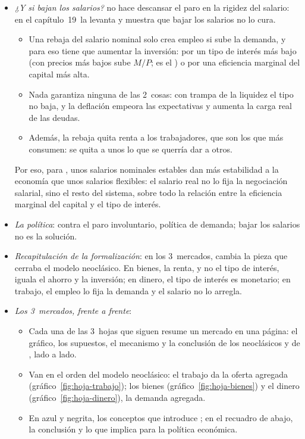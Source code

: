 \documentclass[11pt]{article}
\begin{document}
\begin{itemize}
\item \emph{¿Y si bajan los salarios?}  no hace descansar el paro en la rigidez del salario: en el capítulo~19~la levanta y muestra que bajar los salarios no lo cura\nocite{Keynes1936}.
  \begin{itemize}
  \item Una rebaja del salario nominal solo crea empleo si sube la demanda, y para eso tiene que aumentar la inversión: por un tipo de interés más bajo (con precios más bajos sube $M/P$; es el ) o por una eficiencia marginal del capital más alta.
  \item Nada garantiza ninguna de las 2~cosas: con trampa de la liquidez el tipo no baja, y la deflación empeora las expectativas y aumenta la carga real de las deudas.
  \item Además, la rebaja quita renta a los trabajadores, que son los que más consumen: se quita a unos lo que se querría dar a otros.
  \end{itemize}
  Por eso, para , unos salarios nominales estables dan más estabilidad a la economía que unos salarios flexibles: el salario real no lo fija la negociación salarial, sino el resto del sistema, sobre todo la relación entre la eficiencia marginal del capital y el tipo de interés\nocite{Keynes1936}.
\item \emph{La política}: contra el paro involuntario, política de demanda; bajar los salarios no es la solución.
\item \emph{Recapitulación de la formalización}: en los 3~mercados,  cambia la pieza que cerraba el modelo neoclásico. En bienes, la renta, y no el tipo de interés, iguala el ahorro y la inversión; en dinero, el tipo de interés es monetario; en trabajo, el empleo lo fija la demanda y el salario no lo arregla.
\end{itemize}

\begin{itemize}
\item \emph{Los 3~mercados, frente a frente}:
  \begin{itemize}
  \item Cada una de las 3~hojas que siguen resume un mercado en una página: el gráfico, los supuestos, el mecanismo y la conclusión de los neoclásicos y de , lado a lado.
  \item Van en el orden del modelo neoclásico: el trabajo da la oferta agregada (gráfico~\ref{fig:hoja-trabajo}); los bienes (gráfico~\ref{fig:hoja-bienes}) y el dinero (gráfico~\ref{fig:hoja-dinero}), la demanda agregada.
  \item En azul y negrita, los conceptos que introduce ; en el recuadro de abajo, la conclusión y lo que implica para la política económica.
  \end{itemize}
\end{itemize}
\end{document}

